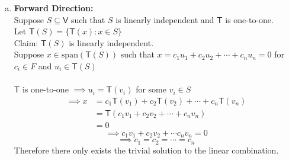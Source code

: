 \begin{enumerate}[(a)]
\item 
\textbf{Forward Direction:}
\\Suppose $S \subseteq \mathsf{V}$ such that  $S$ is linearly independent and
$\mathsf{T}$ is one-to-one.\\ Let $\mathsf{T}(S) = \{\mathsf{T}(x)
\colon x \in S\}$
\\Claim: $\mathsf{T}(S)$ is linearly independent.
\\Suppose $x \in \text{span}(\mathsf{T}(S))$ such that $ x = c_1u_1
+c_2u_2 + \cdots + c_nu_n =0$ for $c_i \in F$ and $u_i \in
\mathsf{T}(S)$
\paragraph{}
$\mathsf{T}$ is one-to-one $\implies u_i =\mathsf{T}(v_i)$ for some
$v_i \in S$
\begin{align}
\implies x &= c_1\mathsf{T}(v_1) +c_2\mathsf{T}(v_2) +\cdots +
c_n\mathsf{T}(v_n)\\
&= \mathsf{T}(c_1v_1 +c_2v_2 +\cdots+c_nv_n)\\
&= 0
\end{align}
\begin{equation}
\implies c_1v_1 + c_2v_2 +\cdots c_nv_n = 0
\end{equation}
\begin{equation}
\implies c_1=c_2=\cdots=c_n
\end{equation}
Therefore there only exists the trivial solution to the linear
combination.


\end{enumerate}
